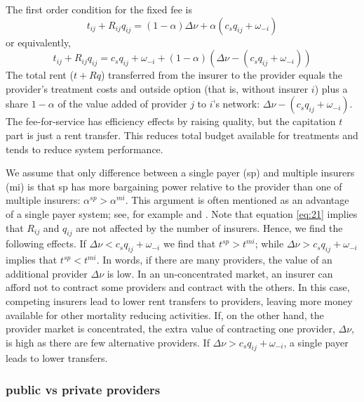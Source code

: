 \documentclass{article}
\begin{document}
The first order condition for the fixed fee is
\begin{equation}
\label{eq:20}
t_{ij} + R_{ij} q_{ij} = (1-\alpha) \Delta \nu+ \alpha (c_s q_{ij} + \omega_{-i})
\end{equation}
or equivalently,
\begin{equation}
\label{eq:23}
t_{ij} + R_{ij} q_{ij} = c_s q_{ij} + \omega_{-i} + (1-\alpha) (\Delta \nu - (c_s q_{ij} + \omega_{-i}))
\end{equation}
The total rent (\(t+Rq\)) transferred from the insurer to the provider equals the provider's treatment costs and outside option (that is, without insurer \(i\)) plus a share \(1-\alpha\) of the value added of provider \(j\) to \(i\)'s network: \(\Delta \nu - (c_s q_{ij} + \omega_{-i})\). The fee-for-service has efficiency effects by raising quality, but the capitation \(t\) part is just a rent transfer. This reduces total budget available for treatments and tends to reduce system performance.

We assume that only difference between a single payer (sp) and multiple insurers (mi) is that sp has more bargaining power relative to the provider than one of multiple insurers: \(\alpha^{sp} > \alpha^{mi}\). This argument is often mentioned as an advantage of a single payer system; see, for example \cite{OberlanderSinglePayer} and \cite{BICHAY2020113454}. Note that equation \eqref{eq:21} implies that \(R_{ij}\) and \(q_{ij}\) are not affected by the number of insurers. Hence, we find the following effects. If \(\Delta \nu< c_s q_{ij} + \omega_{-i}\) we find that \(t^{sp} > t^{mi}\); while \(\Delta \nu > c_s q_{ij}+ \omega_{-i}\) implies that \(t^{sp} < t^{mi}\). In words, if there are many providers, the value of an additional provider \(\Delta \nu\) is low. In an un-concentrated market, an insurer can afford not to contract some providers and contract with the others. In this case, competing insurers lead to lower rent transfers to providers, leaving more money available for other mortality reducing activities. If, on the other hand, the provider market is concentrated, the extra value of contracting one provider, \(\Delta \nu\), is high as there are few alternative providers. If \(\Delta \nu > c_s q_{ij}+ \omega_{-i}\), a single payer leads to lower transfers.

\subsubsection{public vs private providers}
\label{sec:orgfce4e3d}
\end{document}
